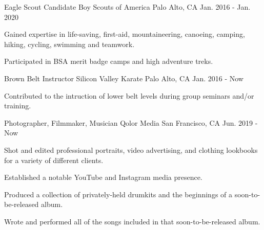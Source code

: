 

\begin{cventries}

  \cventry
    {Eagle Scout Candidate} %
    {Boy Scouts of America} %
    {Palo Alto, CA} %
    {Jan. 2016 - Jan. 2020} %
    {
      \begin{cvitems} %
        \item {Gained expertise in life-saving, first-aid, mountaineering,
		canoeing, camping, hiking, cycling, swimming and teamwork.}
        \item {Participated in BSA merit badge camps and high adventure treks.}
      \end{cvitems}
    }

  \cventry
    {Brown Belt Instructor} %
    {Silicon Valley Karate} %
    {Palo Alto, CA} %
    {Jan. 2016 - Now} %
    {
      \begin{cvitems} %
        \item {Contributed to the intruction of lower belt levels during group
		seminars and/or training.}
      \end{cvitems}
    }

  \cventry
    {Photographer, Filmmaker, Musician} %
    {Qolor Media} %
    {San Francisco, CA} %
    {Jun. 2019 - Now} %
    {
      \begin{cvitems} %
        \item {Shot and edited professional portraits, video advertising, and
		clothing lookbooks for a variety of different clients.}
        \item {Established a notable YouTube and Instagram media presence.}
        \item {Produced a collection of privately-held drumkits and the
		beginnings of a soon-to-be-released album.}
        \item {Wrote and performed all of the songs included in that
		soon-to-be-released album.}
      \end{cvitems}
    }


\end{cventries}
